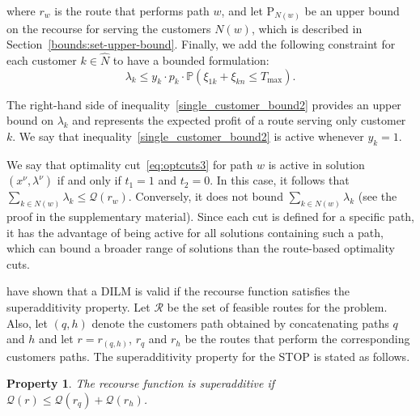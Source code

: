 \documentclass[11pt]{article}
\newtheorem{property}{Property}
\theoremstyle{definition}
\begin{document}
%
where $r_w$ is the route that performs path $w$, and let $\text{P}_{N(w)}$ be an upper bound on the recourse for serving the customers $N(w)$, which is described in Section~\ref{bounds:set-upper-bound}. Finally, we add the following constraint for each customer $k \in \hat N$ to have a bounded formulation:
\begin{equation}
\lambda_k \leq y_{k} \cdot p_k \cdot \mathbb{P}(\xi_{1k} + \xi_{kn} \leq T_{\max}). \label{single_customer_bound2}
\end{equation}

The right-hand side of inequality~\eqref{single_customer_bound2} provides an upper bound on $\lambda_k$ and represents the expected profit of a route serving only customer $k$. We say that inequality~\eqref{single_customer_bound2} is active whenever $y_k = 1$.

We say that optimality cut~\eqref{eq:optcuts3} for path $w$ is active in solution $(x^\nu, \lambda^\nu)$ if and only if $t_1 = 1$ and $t_2 = 0$. In this case, it follows that $\sum_{k \in N(w)} \lambda_k \leq \mathcal{Q}(r_w)$.
Conversely, it does not bound $\sum_{k \in N(w)} \lambda_k$ (see the proof in the supplementary material).
Since each cut is defined for a specific path, it has the advantage of being active for all solutions containing such a path, which can bound a broader range of solutions than the route-based optimality cuts.
%

\cite{Legault2025} have shown that a DILM is valid if the recourse function satisfies the superadditivity property. Let $\mathcal{R}$ be the set of feasible routes for the problem. Also, let $(q,h)$ denote the customers path obtained by concatenating paths $q$ and $h$ and let $r=r_{(q,h)}$, $r_q$ and $r_h$ be the routes that perform the corresponding customers paths. The superadditivity property for the STOP is stated as follows.

\begin{property}
  \label{prop_super_add}
  The recourse function is superadditive if $\mathcal{Q}(r) \leq \mathcal{Q}(r_q) + \mathcal{Q}(r_h)$.
\end{property}
\end{document}
